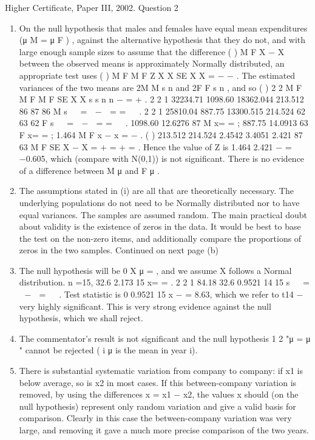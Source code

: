 \documentclass[a4paper,12pt]{article}
\begin{document}
Higher Certificate, Paper III, 2002. Question 2
\begin{enumerate} 
\item  On the null hypothesis that males and females have equal mean
expenditures (μ M = μ F ) , against the alternative hypothesis that they do not,
and with large enough sample sizes to assume that the difference ( ) M F X − X
between the observed means is approximately Normally distributed, an
appropriate test uses ( ) M F
M F
Z X X
SE X X
= −
−
. The estimated variances of the two
means are
2M
M
s
n
and
2F
F
s
n
, and so ( ) 2 2
M F
M F
M F
SE X X s s
n n
− = + .
2
2 1 32234.71 1098.60 18362.044 213.512
86 87 86 M s
 
=  −  = =
 
.
2
2 1 25810.04 887.75 13300.515 214.524
62 63 62 F s
 
=  −  = =
 
.
1098.60 12.6276
87 M x= = ; 887.75 14.0913
63 F x= = ; 1.464 M F x − x = − .
( ) 213.512 214.524 2.4542 3.4051 2.421
87 63 M F SE X − X = + = + = .
Hence the value of Z is 1.464
2.421
− = −0.605, which (compare with N(0,1)) is not
significant.
There is no evidence of a difference between M μ and F μ .
\item  The assumptions stated in (i) are all that are theoretically necessary.
The underlying populations do not need to be Normally distributed nor to have
equal variances. The samples are assumed random. The main practical doubt
about validity is the existence of zeros in the data. It would be best to base the
test on the non-zero items, and additionally compare the proportions of zeros
in the two samples.
Continued on next page
(b) \item  The null hypothesis will be 0 X μ = , and we assume X follows a
Normal distribution. n =15, 32.6 2.173
15
x= = .
2
2 1 84.18 32.6 0.9521
14 15
s
 
=  −  =
 
.
Test statistic is 0
0.9521
15
x − = 8.63, which we refer to t14 − very highly
significant.
This is very strong evidence against the null hypothesis, which we shall reject.
\item  The commentator's result is not significant and the null hypothesis
1 2 "μ = μ " cannot be rejected ( i
μ is the mean in year i).
\item  There is substantial systematic variation from company to company: if
x1 is below average, so is x2 in most cases. If this between-company variation
is removed, by using the differences x = x1 − x2, the values x should (on the
null hypothesis) represent only random variation and give a valid basis for
comparison. Clearly in this case the between-company variation was very
large, and removing it gave a much more precise comparison of the two years.
\end{enumerate}
\end{document}
